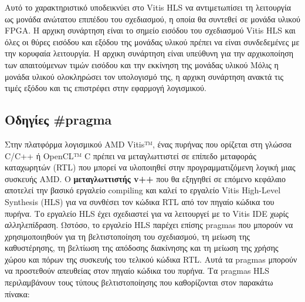 Αυτό το χαρακτηριστικό υποδεικνύει στο Vitis HLS να αντιμετωπίσει τη λειτουργία ως μονάδα ανώτατου επιπέδου του σχεδιασμού, η οποία θα συντεθεί σε μονάδα υλικού FPGA.
Η αρχικη συνάρτηση είναι το σημείο εισόδου του σχεδιασμού Vitis HLS και όλες οι θύρες εισόδου και εξόδου της μονάδας υλικού πρέπει να είναι συνδεδεμένες με την κορυφαία λειτουργία.
Η αρχικη συνάρτηση είναι υπεύθυνη για την αρχικοποίηση των απαιτούμενων τιμών εισόδου και την εκκίνηση της μονάδας υλικού
Μόλις η μονάδα υλικού ολοκληρώσει τον υπολογισμό της, η αρχικη συνάρτηση ανακτά τις τιμές εξόδου και τις επιστρέφει στην εφαρμογή λογισμικού.

\subsection{Οδηγίες \#pragma}
Στην πλατφόρμα λογισμικού AMD Vitis™, ένας πυρήνας που ορίζεται στη γλώσσα C/C++ ή OpenCL™ C πρέπει να μεταγλωττιστεί σε επίπεδο μεταφοράς καταχωρητών (RTL) 
που μπορεί να υλοποιηθεί στην προγραμματιζόμενη λογική μιας συσκευής AMD. 
Ο \textbf{μεταγλωττιστής v++} που θα εξηγηθεί σε επόμενο κεφάλαιο αποτελεί την βασικό εργαλείο compiling και καλεί το εργαλείο Vitis High-Level Synthesis (HLS)
για να συνθέσει τον κώδικα RTL από τον πηγαίο κώδικα του πυρήνα.
Το εργαλείο HLS έχει σχεδιαστεί για να λειτουργεί με το Vitis IDE χωρίς αλληλεπίδραση.
Ωστόσο, το εργαλείο HLS παρέχει επίσης pragmas που μπορούν να χρησιμοποιηθούν για τη βελτιστοποίηση του σχεδιασμού,
τη μείωση της καθυστέρησης, τη βελτίωση της απόδοσης διακίνησης και τη μείωση της χρήσης χώρου και πόρων της συσκευής του τελικού κώδικα RTL.
Αυτά τα pragmas μπορούν να προστεθούν απευθείας στον πηγαίο κώδικα του πυρήνα.
Τα pragmas HLS περιλαμβάνουν τους τύπους βελτιστοποίησης που καθορίζονται στον παρακάτω πίνακα:

